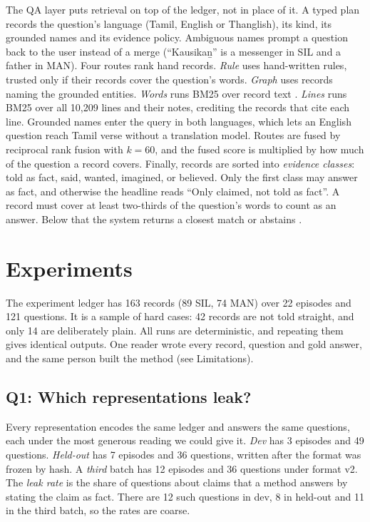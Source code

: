 \documentclass[11pt]{article}
\begin{document}
The QA layer puts retrieval on top of the ledger, not in place of it. A typed plan records the question's language (Tamil, English or Thanglish), its kind, its grounded names and its evidence policy. Ambiguous names prompt a question back to the user instead of a merge (``Kausika\b{n}'' is a messenger in SIL and a father in MAN). Four routes rank hand records. \emph{Rule} uses hand-written rules, trusted only if their records cover the question's words. \emph{Graph} uses records naming the grounded entities. \emph{Words} runs BM25 over record text \citep{Robertson2009Bm25}. \emph{Lines} runs BM25 over all 10,209 lines and their notes, crediting the records that cite each line. Grounded names enter the query in both languages, which lets an English question reach Tamil verse without a translation model. Routes are fused by reciprocal rank fusion \citep{Cormack2009ReciprocalRank} with $k{=}60$, and the fused score is multiplied by how much of the question a record covers. Finally, records are sorted into \emph{evidence classes}: told as fact, said, wanted, imagined, or believed. Only the first class may answer as fact, and otherwise the headline reads ``Only claimed, not told as fact''. A record must cover at least two-thirds of the question's words to count as an answer. Below that the system returns a closest match or abstains \citep{Rajpurkar2018KnowWhat}.

\section{Experiments}
\label{sec:exp}

The experiment ledger has 163 records (89 SIL, 74 MAN) over 22 episodes and 121 questions. It is a sample of hard cases: 42 records are not told straight, and only 14 are deliberately plain. All runs are deterministic, and repeating them gives identical outputs. One reader wrote every record, question and gold answer, and the same person built the method (see Limitations).

\subsection{Q1: Which representations leak?}
\label{sec:rep}
Every representation encodes the same ledger and answers the same questions, each under the most generous reading we could give it. \emph{Dev} has 3 episodes and 49 questions. \emph{Held-out} has 7 episodes and 36 questions, written after the format was frozen by hash. A \emph{third} batch has 12 episodes and 36 questions under format v2. The \emph{leak rate} is the share of questions about claims that a method answers by stating the claim as fact. There are 12 such questions in dev, 8 in held-out and 11 in the third batch, so the rates are coarse.
\end{document}
